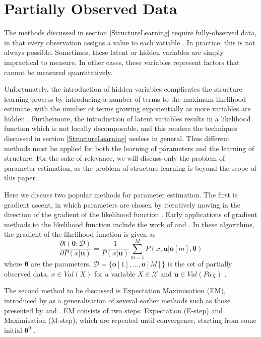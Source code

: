 \documentclass [11pt]{article}
\begin{document}
\section{Partially Observed Data}\label{PartiallyObservedData}
The methods discussed in section \ref{StructureLearning} require fully-observed data, in that every observation assigns a value to each variable \citep{koller09}. In practice, this is not always possible. Sometimes, these latent or hidden variables are simply impractical to measure. In other cases, these variables represent factors that cannot be measured quantitatively. 

Unfortunately, the introduction of hidden variables complicates the structure learning process by introducing a number of terms to the maximum likelihood estimate, with the number of terms growing exponentially as more variables are hidden \citep{koller09}. Furthermore, the introduction of latent variables results in a likelihood function which is not locally decomposable, and this renders the techniques discussed in section \ref{StructureLearning} useless in general. Thus different methods must be applied for both the learning of parameters and the learning of structure. For the sake of relevance, we will discuss only the problem of parameter estimation, as the problem of structure learning is beyond the scope of this paper.

Here we discuss two popular methods for parameter estimation. The first is gradient ascent, in which parameters are chosen by iteratively moving in the direction of the gradient of the likelihood function \citep{koller09}. Early applications of gradient methods to the likelihood function include the work of \cite{thiesson95} and \cite{binder97}. In these algorithms, the gradient of the likelihood function is given as
\begin{equation*}
\frac{\partial l(\boldsymbol{\theta}:\mathcal{D})}{\partial P(x|\boldsymbol{u})} = \frac{1}{P(x|\boldsymbol{u})}\sum_{m=1}^{M}P(x,\boldsymbol{u}|\boldsymbol{o}[m],\boldsymbol{\theta})
\end{equation*}
where $\boldsymbol{\theta}$ are the parameters, $\mathcal{D} = \{\boldsymbol{o}[1],...,\boldsymbol{o}[M]\}$ is the set of partially observed data, $x \in Val(X)$ for a variable $X \in \mathcal{X}$ and $\boldsymbol{u} \in Val(Pa_{X})$ \citep{koller09}.

The second method to be discussed is Expectation Maximisation (EM), introduced by \cite{dempster77} as a generalisation of several earlier methods such as those presented by \cite{baum70} and \cite{orchard72}. EM consists of two steps: Expectation (E-step) and Maximisation (M-step), which are repeated until convergence, starting from some initial $\boldsymbol{\theta}^{0}$  \citep{koller09}. 
\end{document}
